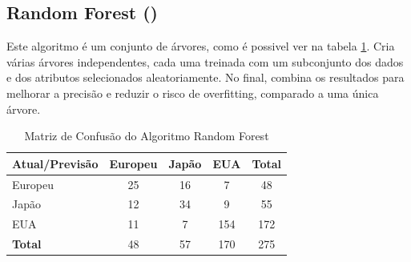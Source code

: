 \documentclass[conference]{IEEEtran}
\begin{document}
\subsection{Random Forest (\cite{forest})}
Este algoritmo é um conjunto de árvores, como é possivel ver na tabela \ref{tab:conf_matrix_forest}. Cria várias árvores
independentes, cada uma treinada com um subconjunto dos dados e dos atributos selecionados aleatoriamente. No final,
combina os resultados para melhorar a precisão e reduzir o risco de overfitting, comparado a uma única árvore.
\begin{table}[!ht]
	\centering
	\begin{tabular}{lcccc}
		\toprule
		\textbf{Atual/Previsão} & \textbf{Europeu} & \textbf{Japão} & \textbf{EUA} & \textbf{Total} \\
		\midrule
		Europeu                 & 25               & 16             & 7           & 48             \\
		Japão                   & 12                & 34             & 9            & 55             \\
		EUA                     & 11               & 7              & 154          & 172            \\
		\midrule
		\textbf{Total}          & 48               & 57             & 170          & 275            \\
		\bottomrule
	\end{tabular}
	\caption{Matriz de Confusão do Algoritmo Random Forest}
	\label{tab:conf_matrix_forest}

\end{table}

\end{document}
